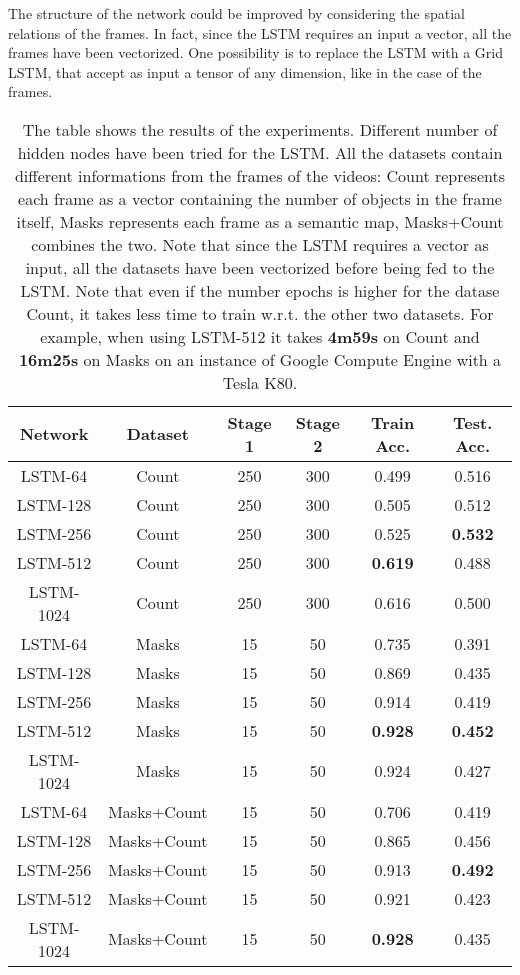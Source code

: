 \documentclass[12pt]{article}
\numberwithin{equation}{section} %
\numberwithin{figure}{section} %
\numberwithin{table}{section} %
\theoremstyle{definition}
\begin{document}
The structure of the network could be improved by considering
the spatial relations of the frames. In fact, since the LSTM
requires an input a vector, all the frames have been
vectorized. One possibility is to replace the LSTM
with a Grid LSTM\cite{Kalchbrenner2015GridLS}, that
accept as input a tensor of any dimension, like in the
case of the frames.

\begin{table}
	\centering
	\begin{tabular}{*{6}{c}}
		Network & Dataset & Stage 1 & Stage 2 & Train Acc. & Test. Acc. \\
		\hline
		LSTM-64 & Count & 250 & 300 & 0.499 & 0.516 \\
		LSTM-128 & Count & 250 & 300 & 0.505 & 0.512 \\
		LSTM-256 & Count & 250 & 300 & 0.525 & \textbf{0.532} \\
		LSTM-512 & Count & 250 & 300 & \textbf{0.619} & 0.488 \\
		LSTM-1024 & Count & 250 & 300 & 0.616 & 0.500 \\
		\hline
		LSTM-64 & Masks & 15 & 50 & 0.735 & 0.391 \\
		LSTM-128 & Masks & 15 & 50 & 0.869 & 0.435 \\
		LSTM-256 & Masks & 15 & 50 & 0.914 & 0.419 \\
		LSTM-512 & Masks & 15 & 50 & \textbf{0.928} & \textbf{0.452} \\
		LSTM-1024 & Masks & 15 & 50 & 0.924 & 0.427 \\
		\hline
		LSTM-64 & Masks+Count & 15 & 50 & 0.706 & 0.419 \\
		LSTM-128 & Masks+Count & 15 & 50 & 0.865 & 0.456 \\
		LSTM-256 & Masks+Count & 15 & 50 & 0.913 & \textbf{0.492} \\
		LSTM-512 & Masks+Count & 15 & 50 & 0.921 & 0.423 \\
		LSTM-1024 & Masks+Count & 15 & 50 & \textbf{0.928} & 0.435 \\
	\end{tabular}
	\caption{The table shows the results of the experiments.
	    Different number of hidden nodes have been tried
	    for the LSTM. All the datasets contain different
	    informations from the frames of the videos:
	    Count represents each frame as a vector containing
	    the number of objects in the frame itself, Masks
	    represents each frame as a semantic map,
	    Masks+Count combines the two. Note that since the
	    LSTM requires a vector as input, all the datasets
	    have been vectorized before being fed to the LSTM.
	    Note that even if the number epochs is higher
	    for the datase Count, it takes less time to train
	    w.r.t. the other two datasets. For example, when
	    using LSTM-512 it takes \textbf{4m59s} on Count and
	    \textbf{16m25s} on Masks on an instance of Google
	    Compute Engine with a Tesla K80.}
    \label{table:lstm-experiments}
\end{table}
\end{document}

